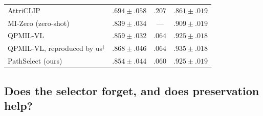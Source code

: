 \documentclass{article}
\newif\ifmarkup \markuptrue
\newcommand{\repc}[3]{\ifmarkup\textcolor{gray}{\sout{#2}}\textcolor{#1}{#3}\else#3\fi}
\newcommand{\repP}[2]{\repc{violet}{#1}{#2}}  %
\begin{document}
\begin{table}[!t]
\begin{tabular}{lccc}
AttriCLIP \cite{wang2023attriclip} & $.694{\pm}.058$ & $.207$ & $.861{\pm}.019$ \\
MI-Zero \cite{lu2023mizero} (zero-shot) & $.839{\pm}.034$ & --- & $.909{\pm}.019$ \\
QPMIL-VL \cite{gou2025qpmil} & $.859{\pm}.032$ & $.064$ & $.925{\pm}.018$ \\
\midrule
QPMIL-VL, reproduced by us$^\ddagger$ & $.868{\pm}.046$ & $.064$ & $.935{\pm}.018$ \\
\midrule
PathSelect (ours) & $.854{\pm}.044$ & $.060$ & $.925{\pm}.019$ \\
\bottomrule
\end{tabular}
\end{table}

\subsection{Does the selector forget, and does preservation help?}
\label{ssec:ablation}

\begin{table}[!htb]
\centering\footnotesize\renewcommand{\arraystretch}{0.92}
\setlength{\tabcolsep}{4pt}
\caption{\textbf{Leave-out chain in both task orders} \protect\repP{(ConSlide benchmark, ten-fold CV; ACC mean$\pm$sd, forgetting mean)}{(TCGA continual WSI benchmark, ten-fold CV; ACC mean$\pm$sd, forgetting mean)}. Reverse = ESCA$\rightarrow$RCC$\rightarrow$BRCA$\rightarrow$LUNG; forward = the opposite. The zero-shot reference selects the eight patches with the highest class-text cosine, pools them uniformly, and uses the frozen head; it learns nothing and therefore cannot forget. Last two rows: the strongest published method, as reported in \cite{gou2025qpmil} and as rerun by us with its released code.}
\label{tab:chain}
\end{table}
\end{document}

